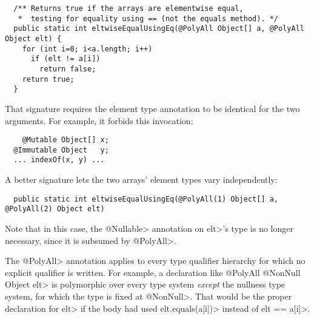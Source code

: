 \begin{Verbatim}
  /** Returns true if the arrays are elementwise equal,
   *  testing for equality using == (not the equals method). */
  public static int eltwiseEqualUsingEq(@PolyAll Object[] a, @PolyAll Object elt) {
    for (int i=0; i<a.length; i++)
      if (elt != a[i])
        return false;
    return true;
  }
\end{Verbatim}

\noindent
That signature requires the element type annotation to be identical for the
two arguments.  For example, it forbids this invocation:

\begin{Verbatim}
    @Mutable Object[] x;
  @Immutable Object   y;
  ... indexOf(x, y) ...
\end{Verbatim}

\noindent
A better signature lets the two arrays' element types vary independently:

\begin{Verbatim}
  public static int eltwiseEqualUsingEq(@PolyAll(1) Object[] a, @PolyAll(2) Object elt)
\end{Verbatim}

\noindent
Note that in this case, the \<@Nullable> annotation on \<elt>'s type is no
longer necessary, since it is subsumed by \<@PolyAll>.

The \<@PolyAll> annotation applies to every type qualifier hierarchy for
which no explicit qualifier is written.  For example, a declaration like
\<@PolyAll @NonNull Object elt> is polymorphic over every type system
\emph{except} the nullness type system, for which the type is fixed at
\<@NonNull>.  That would be the proper declaration for \<elt> if the body
had used \<elt.equals(a[i])> instead of \<elt == a[i]>.





